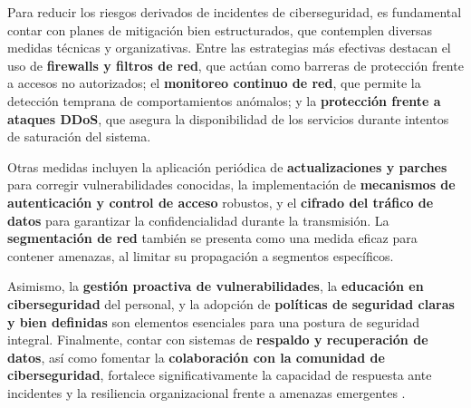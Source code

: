 \documentclass[a4paper, 10pt]{article}
\begin{document}
    Para reducir los riesgos derivados de incidentes de ciberseguridad, es fundamental contar con planes de mitigación bien estructurados, 
    que contemplen diversas medidas técnicas y organizativas. 
    Entre las estrategias más efectivas destacan el uso de \textbf{firewalls y filtros de red}, que actúan como barreras de 
    protección frente a accesos no autorizados; el \textbf{monitoreo continuo de red}, que permite la detección temprana de comportamientos anómalos; 
    y la \textbf{protección frente a ataques DDoS}, que asegura la disponibilidad de los servicios durante intentos de saturación del sistema.
    
    \par\vspace{0.5cm}

    Otras medidas incluyen la aplicación periódica de \textbf{actualizaciones y parches} para corregir vulnerabilidades conocidas, 
    la implementación de \textbf{mecanismos de autenticación y control de acceso} robustos, y el \textbf{cifrado del tráfico de datos} para garantizar la confidencialidad 
    durante la transmisión. La \textbf{segmentación de red} también se presenta como una medida eficaz para contener amenazas, al limitar su propagación a segmentos específicos.
    \par\vspace{0.5cm}

    Asimismo, la \textbf{gestión proactiva de vulnerabilidades}, la \textbf{educación en ciberseguridad} del personal, y la adopción de \textbf{políticas de seguridad claras y bien definidas} son elementos esenciales para una postura de seguridad integral. Finalmente, contar con sistemas de \textbf{respaldo y recuperación de datos}, así como fomentar la \textbf{colaboración con la comunidad de ciberseguridad}, fortalece significativamente la capacidad de respuesta ante incidentes y la resiliencia organizacional frente a amenazas emergentes \cite{mitigacion}.
    
\end{document}
